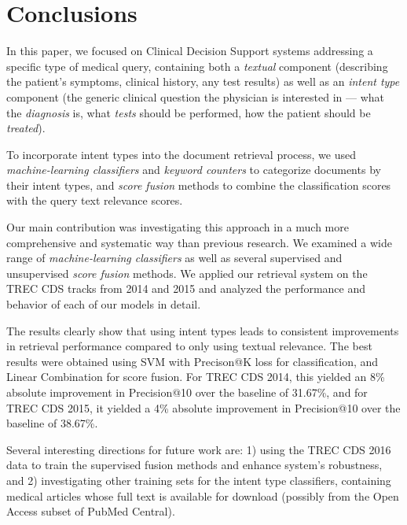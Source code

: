 \chapter{Conclusions}


In this paper, we focused on Clinical Decision Support systems addressing
a specific type of medical query, containing both a \emph{textual} component
(describing the patient's symptoms, clinical history, any test results)
as well as an \emph{intent type} component (the generic clinical question the physician is interested in
--- what the \emph{diagnosis} is, what \emph{tests} should be performed, how the patient should be \emph{treated}).

To incorporate intent types into the document retrieval process, we used
\emph{machine-learning classifiers} and \emph{keyword counters} to categorize documents by their intent types,
and \emph{score fusion} methods to combine the classification scores with the query text relevance scores.

Our main contribution was investigating this approach in a much more comprehensive and systematic way
than previous research.
We examined a wide range of \emph{machine-learning classifiers}
as well as several supervised and unsupervised \emph{score fusion} methods.
We applied our retrieval system on the TREC CDS tracks from 2014 and 2015 and analyzed
the performance and behavior of each of our models in detail.

The results clearly show that using intent types leads to consistent improvements in retrieval performance
compared to only using textual relevance.
The best results were obtained using SVM with Precison@K loss for classification,
and Linear Combination for score fusion.
For TREC CDS 2014, this yielded an 8\% absolute improvement in Precision@10 over the baseline of 31.67\%,
and for TREC CDS 2015, it yielded a 4\% absolute improvement in Precision@10 over the baseline of 38.67\%.

Several interesting directions for future work are:
1) using the TREC CDS 2016 data to train the supervised fusion methods and enhance system's robustness,
and 2) investigating other training sets for the
intent type classifiers, containing medical articles whose full text is available for download
(possibly from the Open Access subset of PubMed Central).

